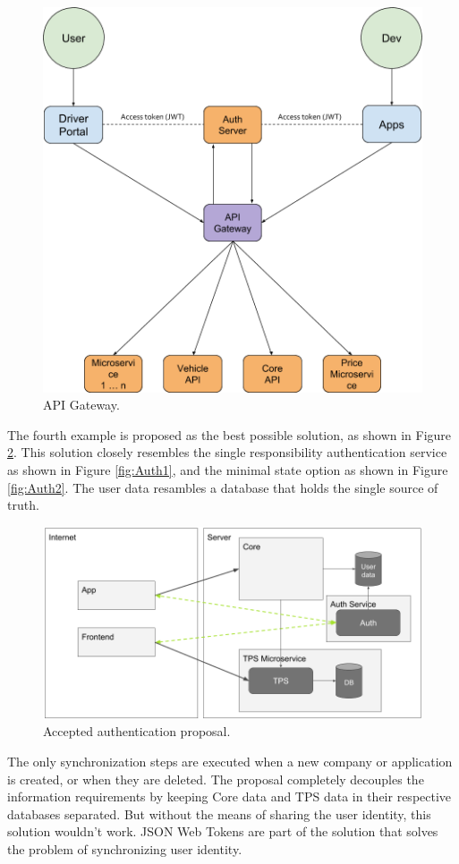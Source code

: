 \begin{figure}[H]
	\centering
	\includegraphics[width=.7\textwidth]{Auth3}
	\caption[API Gateway]{API Gateway.}
	\label{fig:Auth3}
\end{figure}

The fourth example is proposed as the best possible solution, as shown in Figure \ref{fig:Authentication}. This solution closely resembles the single responsibility authentication service as shown in Figure \ref{fig:Auth1}, and the minimal state option as shown in Figure \ref{fig:Auth2}. The user data resambles a database that holds the single source of truth.

\begin{figure}[H]
	\centering
	\includegraphics[width=1\textwidth]{Authentication}
	\caption[Authentication]{Accepted authentication proposal.}
	\label{fig:Authentication}
\end{figure}

The only synchronization steps are executed when a new company or application is created, or when they are deleted. The proposal completely decouples the information requirements by keeping Core data and TPS data in their respective databases separated. But without the means of sharing the user identity, this solution wouldn't work. JSON Web Tokens are part of the solution that solves the problem of synchronizing user identity.

